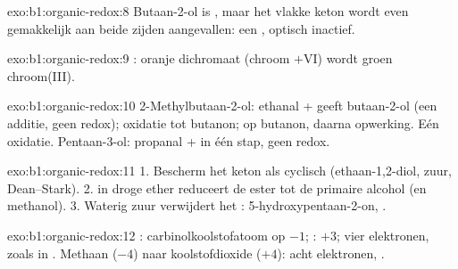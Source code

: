 \begin{solution}{exo:b1:organic-redox:8}
Butaan-2-ol is , maar het vlakke keton wordt even gemakkelijk aan
beide zijden aangevallen: een , optisch inactief.
\end{solution}

\begin{solution}{exo:b1:organic-redox:9}
: oranje
dichromaat (chroom $+$VI) wordt groen chroom(III).
\end{solution}

\begin{solution}{exo:b1:organic-redox:10}
2-Methylbutaan-2-ol: ethanal +  geeft butaan-2-ol (een
additie, geen redox); oxidatie tot butanon;  op butanon,
daarna opwerking. Eén oxidatie. Pentaan-3-ol: propanal + 
in één stap, geen redox.
\end{solution}

\begin{solution}{exo:b1:organic-redox:11}
1. Bescherm het keton als cyclisch  (ethaan-1,2-diol, zuur,
Dean--Stark). 2.  in droge ether reduceert de ester tot de
primaire alcohol (en methanol). 3. Waterig zuur verwijdert het :
5-hydroxypentaan-2-on, .
\end{solution}

\begin{solution}{exo:b1:organic-redox:12}
: carbinolkoolstofatoom op $-1$; : $+3$; vier
elektronen, zoals in . Methaan
($-4$) naar koolstofdioxide ($+4$): acht elektronen,
.
\end{solution}

